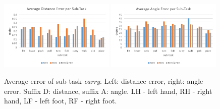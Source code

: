 \begin{figure}[H]
	\centering
	\includegraphics[width=0.49\textwidth]{figures/averageDistanceErrorPerSubTask.png}
	\includegraphics[width=0.49\textwidth]{figures/averageAngleErrorPerSubTask.png}
	\caption[Average error of sub-task\textit{carry}]{Average error of sub-task \textit{carry}. Left: distance error, right: angle error. Suffix D: distance, suffix A: angle. LH - left hand, RH - right hand, LF - left foot, RF - right foot.}
	\label{fig:avgErrorPerSubTask}
\end{figure}
	
